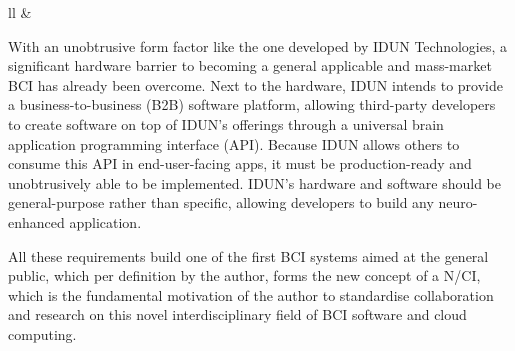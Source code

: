 \begin{table}[ht]
{\begin{tabular}{ll}
        &
                                                                                                               \\ \hline
    \end{tabular}%
  }
  \vspace{10pt}
  \caption{Axes label descriptions of the three-dimensionality for the definition of a N/CI as shown on \autoref{fig:nci-definition}.}
  \label{tab:nci-axis}
\end{table}

\newpage

With an unobtrusive form factor like the one developed by IDUN Technologies, a significant hardware barrier to becoming a general applicable and mass-market BCI has already been overcome. Next to the hardware, IDUN intends to provide a business-to-business (B2B) software platform, allowing third-party developers to create software on top of IDUN's offerings through a universal brain application programming interface (API). Because IDUN allows others to consume this API in end-user-facing apps, it must be production-ready and unobtrusively able to be implemented. IDUN's hardware and software should be general-purpose rather than specific, allowing developers to build any neuro-enhanced application.

All these requirements build one of the first BCI systems aimed at the general public, which per definition by the author, forms the new concept of a N/CI, which is the fundamental motivation of the author to standardise collaboration and research on this novel interdisciplinary field of BCI software and cloud computing.

